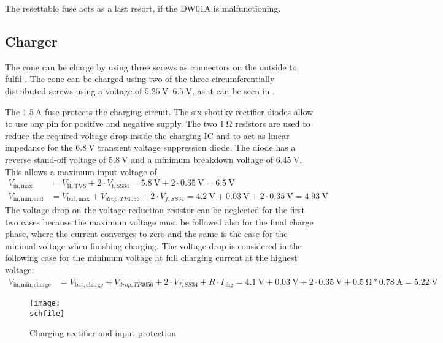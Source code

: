 The resettable fuse acts as a last resort, if the DW01A is malfunctioning.

\FloatBarrier

\subsection{Charger}
\label{sec_charger}

The cone can be charge by using three screws as connectors on the outside to fulfil . The cone can be charged using two of the three circumferentially distributed screws using a voltage of $\qtyrange{5.25}{6.5}{\V}$, as it can be seen in . 

The $\SI{1.5}{\A}$ fuse protects the charging circuit. The six shottky rectifier diodes allow to use any pin for positive and negative supply. The two $\SI{1}{\ohm}$ resistors are used to reduce the required voltage drop inside the charging IC and to act as linear impedance for the $\SI{6.8}{\V}$ transient voltage suppression diode. The diode has a reverse stand-off voltage of $\SI{5.8}{\V}$ and a minimum breakdown voltage of $\SI{6.45}{\V}$. 
This allows a maximum input voltage of 
\begin{align}
	V_\mathrm{in,max} &= V_\mathrm{R,TVS} + 2\cdot V_\mathrm{f,SS34} = \SI{5.8}{\V}+ 2\cdot \SI{0.35}{\V}=\SI{6.5}{\V}\\
	V_\mathrm{in,min,end} &= V_\mathrm{bat,max} + V_{drop, TP4056} + 2\cdot V_{f,SS34} = \SI{4.2}{\V} + \SI{0.03}{\V} + 2\cdot \SI{0.35}{\V} = \SI{4.93}{\V}
\end{align}
The voltage drop on the voltage reduction resistor can be neglected for the first two cases because the maximum voltage must be followed also for the final charge phase, where the current converges to zero and the same is the case for the minimal voltage when finishing charging. 
The voltage drop is considered in the following case for the minimum voltage at full charging current at the highest voltage:
\begin{align}
	V_\mathrm{in,min,charge} &= V_\mathrm{bat,charge} + V_{drop, TP4056} + 2\cdot V_{f,SS34} + R \cdot I_\mathrm{chg} = \SI{4.1}{\V} + \SI{0.03}{\V} + 2\cdot \SI{0.35}{\V} + \SI{0.5}{\ohm} * \SI{0.78}{\A} = \SI{5.22}{\V}
\end{align}

\begin{figure}[h!]
    \centering
    \texttt{[image: \\schfile]}
    \caption{Charging rectifier and input protection}
    \label{fig_chg_input}
\end{figure}

